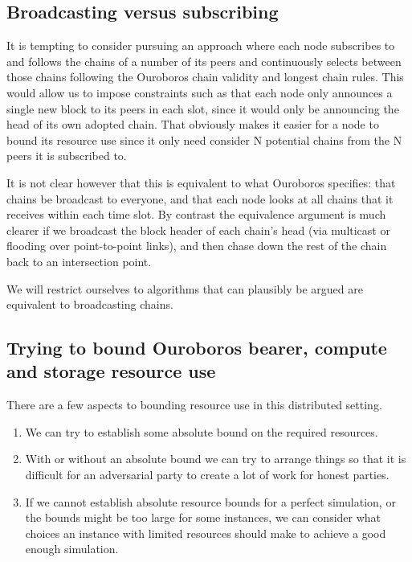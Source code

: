 \documentclass{article}
\theoremstyle{definition}{
  \newtheorem{lemma}{Lemma}[section] %
  \newtheorem{definition}[lemma]{Definition}
}
\theoremstyle{theorem}{
  \newtheorem{invariant}[lemma]{Invariant}
  \newtheorem{proofobligation}[lemma]{Proof Obligation}
}
\numberwithin{equation}{lemma}
\begin{document}
\subsection{Broadcasting versus subscribing}

It is tempting to consider pursuing an approach where each node subscribes to
and follows the chains of a number of its peers and continuously selects
between those chains following the Ouroboros chain validity and longest chain
rules. This would allow us to impose constraints such as that each node only
announces a single new block to its peers in each slot, since it would only be
announcing the head of its own adopted chain. That obviously makes it easier
for a node to bound its resource use since it only need consider N potential
chains from the N peers it is subscribed to.

It is not clear however that this is equivalent to what Ouroboros specifies:
that chains be broadcast to everyone, and that each node looks at all chains
that it receives within each time slot. By contrast the equivalence argument is
much clearer if we broadcast the block header of each chain's head (via
multicast or flooding over point-to-point links), and then chase down the rest
of the chain back to an intersection point.

We will restrict ourselves to algorithms that can plausibly be argued are
equivalent to broadcasting chains.

\subsection{Trying to bound Ouroboros bearer, compute and storage resource use}

There are a few aspects to bounding resource use in this distributed setting.
\begin{enumerate}
\item We can try to establish some absolute bound on the required resources.
\item With or without an absolute bound we can try to arrange things so that it
      is difficult for an adversarial party to create a lot of work for honest
      parties.
\item If we cannot establish absolute resource bounds for a perfect simulation,
      or the bounds might be too large for some instances, we can consider what
      choices an instance with limited resources should make to achieve a good
      enough simulation.
\end{enumerate}
\end{document}
